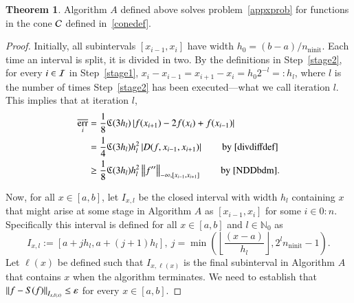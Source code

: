 \documentclass[review]{elsarticle}
\newcommand{\abstol}{\varepsilon}
\newcommand{\zton}{0\!:\!n}
\theoremstyle{definition}
\newcommand{\Ixl}{I_{x,l}}
\DeclareMathOperator{\ninit}{ninit}
\DeclareMathOperator{\oerr}{\overline{err}}
\newtheorem{theorem}{Theorem}
\begin{document}
\begin{theorem} \label{thm:algAworks}
	Algorithm $A$ defined above solves problem~\eqref{appxprob} for functions in the
	cone $\mathcal{C}$ defined in~\eqref{conedef}.
\end{theorem}

\begin{proof} 
	Initially, all subintervals $[x_{i-1},x_i]$ have width $h_0 = (b-a)/n_{\ninit}$.  Each time an interval is split, it is divided in two.  By the definitions in Step~\ref{stage2}, for every $i \in \mathcal{I}$ in Step~\ref{stage1},  $x_i-x_{i-1} = x_{i+1} - x_i = h_0 2^{-l} =: h_l$, where $l$ is the number of times Step~\ref{stage2} has been executed---what we call iteration $l$.  This implies that at iteration $l$,
	\begin{align}
	\nonumber
	\oerr_i & =\frac{1}{8} \fC(3h_l)\abs{f(x_{i+1}) - 2f(x_i) + f(x_{i-1})}  \\ 
	& =  \frac{1}{4} \fC(3h_l) h_l^2 \abs{D(f,x_{i-1},x_{i+1})}  \qquad \text{by \eqref{divdiffdef}}  \label{divdiffbd}\\
	& \ge \frac{1} 8 \fC(3h_l) h_l^2 \norm[-\infty,{[x_{i-1},x_{i+1}]}]{f''}  \qquad \text{by \eqref{NDDbdm}}. \label{oerrbd}
	\end{align}
	
	Now, for all $x \in [a,b]$, let $\Ixl$ be the closed interval with width $h_l$ containing $x$ that might arise at some stage in Algorithm $A$ as $[x_{i-1}, x_i]$ for some $i \in \zton$.  Specifically this interval is defined for all $ x \in [a,b]$ and $l \in \mathbb{N}_0$ as
	\begin{equation}\label{Ixldef}
	\Ixl := \left[a+jh_l,a+(j+1) h_l\right], \ j=\min \left(\left\lfloor\frac{(x-a)}{h_l}\right\rfloor, 2^l n_{\ninit}-1 \right ).
	\end{equation}
Let $\ell(x)$ be defined such that $I_{x,\ell(x)}$ is the final subinterval in
Algorithm $A$ that contains $x$ when the algorithm terminates. We need to establish that $\norm[I_{x,\ell(x)}]{f - S(f)} \le \abstol$ for every $x \in [a,b]$.


\end{proof}
\end{document}
